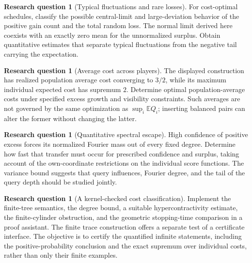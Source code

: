 \documentclass[11pt,letterpaper]{article}
\theoremstyle{definition}
\newcommand{\E}{\mathbb E}
\newtheorem{question}[theorem]{Research question}
\begin{document}
\begin{question}[Typical fluctuations and rare losses]
For cost-optimal schedules, classify the possible central-limit and
large-deviation behavior of the positive gain count and the total
random loss. The normal limit derived here coexists with an exactly
zero mean for the unnormalized surplus. Obtain quantitative estimates
that separate typical fluctuations from the negative tail carrying
the expectation.
\end{question}

\begin{question}[Average cost across players]
The displayed construction has realized population average cost
converging to \(3/2\), while its maximum individual expected cost has
supremum \(2\). Determine optimal population-average costs under
specified excess growth and visibility constraints. Such averages are
not governed by the same optimization as \(\sup_i\E Q_i\); inserting
balanced pairs can alter the former without changing the latter.
\end{question}

\begin{question}[Quantitative spectral escape]
High confidence of positive excess forces its normalized Fourier
mass out of every fixed degree. Determine how fast that transfer must
occur for prescribed confidence and surplus, taking account of the
own-coordinate restrictions on the individual score functions.
The variance bound suggests that query influences, Fourier degree,
and the tail of the query depth should be studied jointly.
\end{question}

\begin{question}[A kernel-checked cost classification]
Implement the finite-tree semantics, the degree bound, a suitable
hypercontractivity estimate, the finite-cylinder obstruction, and the
geometric stopping-time comparison in a proof assistant. The finite
trace construction offers a separate test of a certificate interface.
The objective is to certify the quantified infinite statements,
including the positive-probability conclusion and the exact supremum
over individual costs, rather than only their finite examples.
\end{question}
\end{document}
